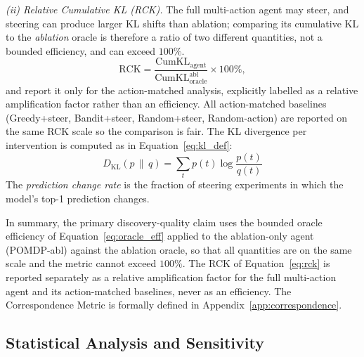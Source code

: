\emph{(ii) Relative Cumulative KL (RCK).} The full multi-action agent may steer,
and steering can produce larger KL shifts than ablation; comparing its cumulative
KL to the \emph{ablation} oracle is therefore a ratio of two different quantities,
not a bounded efficiency, and can exceed $100\%$. 
\begin{equation}
  \label{eq:rck}
  \text{RCK} = \frac{\text{CumKL}_{\text{agent}}}
                    {\text{CumKL}^{\text{abl}}_{\text{oracle}}} \times 100\%,
\end{equation}
and report it only for the action-matched analysis, explicitly labelled as a
relative amplification factor rather than an efficiency. All action-matched
baselines (Greedy+steer, Bandit+steer, Random+steer, Random-action) are reported on
the same RCK scale so the comparison is fair.
The KL divergence per intervention is computed as in Equation~\ref{eq:kl_def}:
\begin{equation}
  \label{eq:kl_def}
  D_\mathrm{KL}(p \,\|\, q) = \sum_t p(t)\log\frac{p(t)}{q(t)}
\end{equation}
The \emph{prediction change rate} is the fraction of steering experiments
in which the model's top-1 prediction changes.

In summary, the primary discovery-quality claim uses the bounded oracle
efficiency of Equation~\ref{eq:oracle_eff} applied to the ablation-only agent
(POMDP-abl) against the ablation oracle, so that all quantities are on the same
scale and the metric cannot exceed $100\%$. The RCK of Equation~\ref{eq:rck} is
reported separately as a relative amplification factor for the full
multi-action agent and its action-matched baselines, never as an efficiency.
The Correspondence Metric is formally defined in Appendix~\ref{app:correspondence}.

\subsection{Statistical Analysis and Sensitivity}
\label{sec:stats_protocol}

